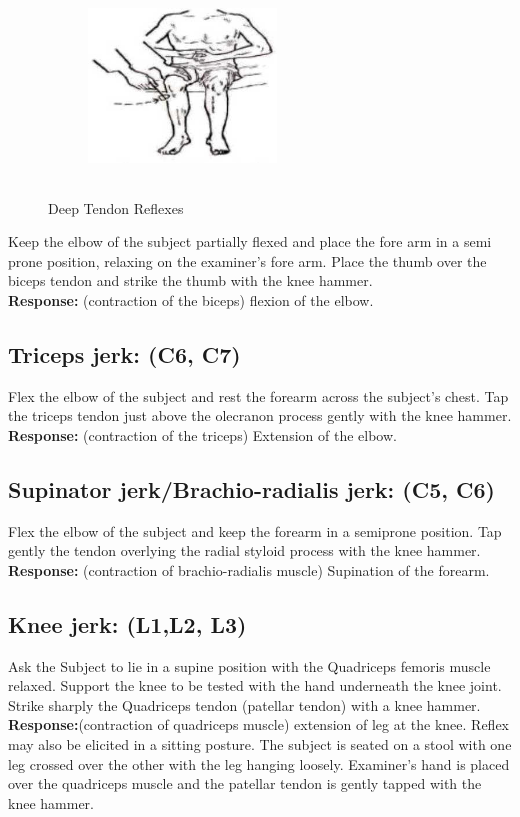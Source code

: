 \documentclass[a4paper,12pt]{book}
\begin{document}
{\begin{figure}[H]
		\begin{subfigure}[t]{.29\textwidth}
			\centering
			\includegraphics[width=5cm,height=5cm]{./clinicalPhysioPic/reflexes/kneeJerk_2.jpg}
		\end{subfigure}
		\caption*{Deep Tendon Reflexes}
	\end{figure}
}
Keep the elbow of the subject partially flexed and place the fore arm in a semi prone position, relaxing on the examiner's fore arm. Place the thumb over the biceps tendon and strike the thumb with the knee hammer.\\
\textbf{Response:} (contraction of the biceps) flexion of the elbow.
\subsection*{Triceps jerk: (C6, C7)}
Flex the elbow of the subject and rest the forearm across the subject's chest. Tap the triceps tendon just above the olecranon process gently with the knee hammer.\\
\textbf{Response:} (contraction of the triceps) Extension of the elbow.
\subsection*{Supinator jerk/Brachio-radialis jerk: (C5, C6)}
Flex the elbow of the subject and keep the forearm in a semiprone position. Tap gently the tendon overlying the radial styloid process with the knee hammer.\\
\textbf{Response:} (contraction of brachio-radialis muscle) Supination of the forearm.
\subsection*{Knee jerk: (L1,L2, L3)}
Ask the Subject to lie in a supine position with the Quadriceps femoris muscle relaxed. Support the knee to be tested with the hand underneath the knee joint. Strike sharply the Quadriceps tendon (patellar tendon) with a knee hammer.\\
\textbf{Response:}(contraction of quadriceps muscle) extension of leg at the knee. Reflex may also be elicited in a sitting posture. The subject is seated on a stool with one leg crossed over the other with the leg hanging loosely. Examiner's hand is placed over the quadriceps muscle and the patellar tendon is gently tapped with the knee hammer.
\end{document}
